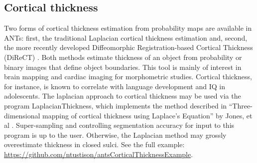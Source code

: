 \documentclass{InsightArticle}
\begin{document}
\subsection{Cortical thickness}
Two forms of cortical thickness estimation from probability maps are available 
in ANTs: first, the traditional Laplacian cortical thickness estimation and, second, 
the more recently developed Diffeomorphic Registration-based Cortical Thickness 
(DiReCT) \cite{Das2009}.  Both methods estimate thickness of an object 
from probability or binary images that define object boundaries.  This tool 
is mainly of interest in brain mapping and cardiac imaging for morphometric 
studies.  Cortical thickness, for instance, is known to correlate with language 
development and IQ in adolescents.  The laplacian approach to 
cortical thickness may be used via the program LaplacianThickness, 
which implements the method described in ``Three-dimensional mapping of cortical thickness using Laplace's Equation'' by 
Jones, et al \cite{}.  Super-sampling 
and controlling segmentation accuracy for input to this program is up 
to the user.  Otherwise, the Laplacian method may grossly overestimate 
thickness in closed sulci.  See the full example:  \href{https://github.com/ntustison/antsCorticalThicknessExample}{https://github.com/ntustison/antsCorticalThicknessExample}.
\end{document}
